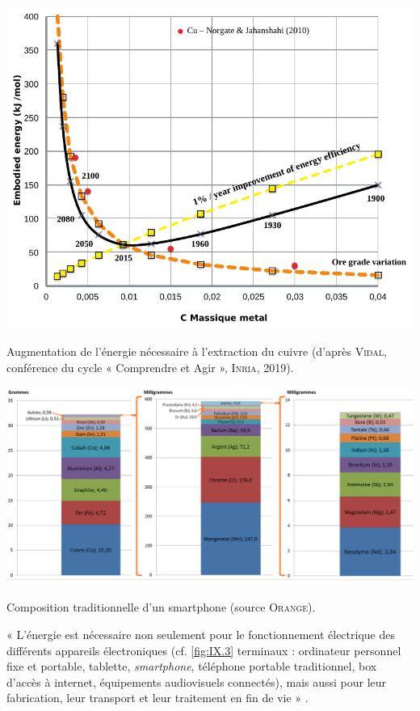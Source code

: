 \begin{jazzfigure}
\includegraphics[width=\linewidth]{./Images/Chapter09/figIX-04-vidal-binaire-2019.png}
\caption{\label{fig:IX.4}Augmentation de l'énergie nécessaire à l’extraction du cuivre (d'après \textsc{Vidal}, conférence du cycle « Comprendre et Agir », \textsc{Inria}, 2019).}
\end{jazzfigure}

\begin{jazzfigure*}
\includegraphics[width=\linewidth]{./Images/Chapter09/figIX-05-composition-smartphone-src-orange.png}
\caption{\label{fig:IX.5}Composition traditionnelle d’un \textup{smartphone} (source \textsc{Orange}).}
\end{jazzfigure*}



« L’énergie est nécessaire non seulement pour le fonctionnement électrique des différents appareils électroniques (cf. \cref{fig:IX.3} terminaux : ordinateur personnel fixe et portable, tablette, \textit{smartphone}, téléphone portable traditionnel, box d’accès à internet, équipements audiovisuels connectés), mais aussi pour leur fabrication, leur transport et leur traitement en fin de vie »  \parencite{Marquet-et-al:2019}.

